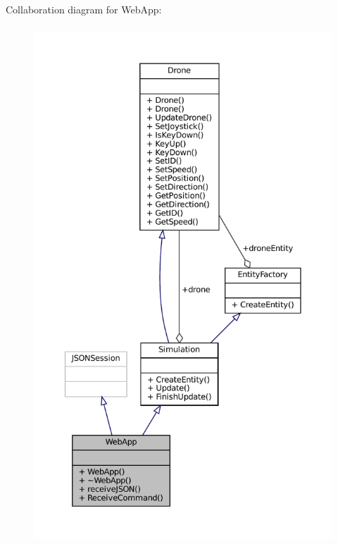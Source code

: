 Collaboration diagram for Web\+App\+:\nopagebreak
\begin{figure}[H]
\begin{center}
\leavevmode
\includegraphics[height=550pt]{classWebApp__coll__graph}
\end{center}
\end{figure}

